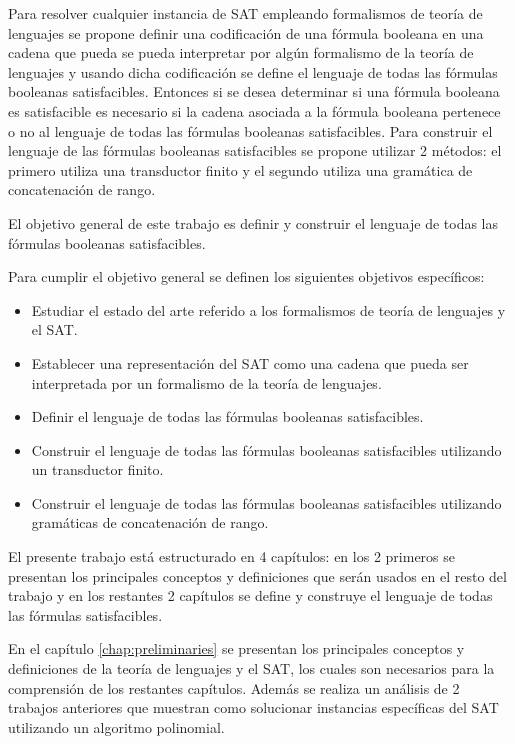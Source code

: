 Para resolver cualquier instancia de SAT empleando formalismos de teoría de lenguajes se propone definir una codificación
de una fórmula booleana en una cadena que pueda se pueda interpretar por algún formalismo de la teoría de lenguajes
y usando dicha codificación se define el lenguaje de todas las fórmulas booleanas satisfacibles. Entonces si se desea
determinar si una fórmula booleana es satisfacible es necesario si la cadena asociada a la  fórmula booleana pertenece o no al lenguaje de todas las fórmulas booleanas satisfacibles. Para construir el lenguaje
de las fórmulas booleanas satisfacibles se propone utilizar 2 métodos: el primero utiliza una transductor finito y el segundo
utiliza una gramática de concatenación de rango.

El objetivo general de este trabajo es definir y construir el lenguaje de todas las fórmulas booleanas satisfacibles.

Para cumplir el objetivo general se definen los siguientes objetivos específicos:

\begin{itemize}
    \item Estudiar el estado del arte referido a los formalismos de teoría de lenguajes y el SAT.
    \item Establecer una representación del SAT como una cadena que pueda ser interpretada por un formalismo de la teoría de lenguajes.
    \item Definir el lenguaje de todas las fórmulas booleanas satisfacibles.
    \item Construir el lenguaje de todas las fórmulas booleanas satisfacibles utilizando un transductor finito.
    \item Construir el lenguaje de todas las fórmulas booleanas satisfacibles utilizando gramáticas de concatenación de rango.
\end{itemize}

El presente trabajo está estructurado en 4 capítulos: en los 2 primeros se presentan los principales conceptos y definiciones
que serán usados en el resto del trabajo y en los restantes 2 capítulos se define y construye el lenguaje de todas las fórmulas satisfacibles.

En el capítulo \ref{chap:preliminaries} se presentan los principales conceptos y definiciones de la teoría de lenguajes y el SAT, los cuales
son necesarios para la comprensión de los restantes capítulos. Además se realiza un análisis de 2 trabajos anteriores
que muestran como solucionar instancias específicas del SAT utilizando un algoritmo polinomial.

